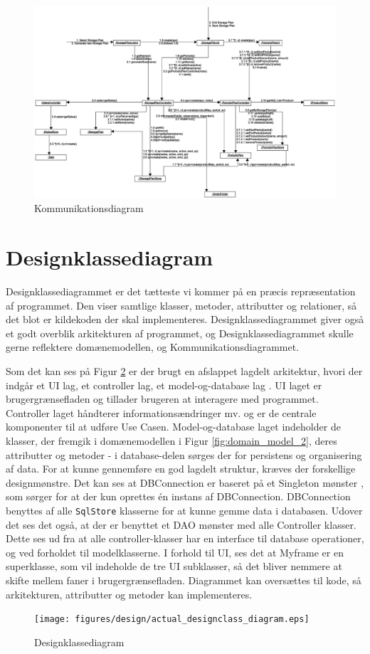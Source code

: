 \begin{landscape}
    \begin{figure}[p]
        \centering
        \includegraphics[width=0.8\hsize]{figures/design/Kommunikationsdiagram.eps}
        \caption{Kommunikationsdiagram}
        \label{fig:Kommunikationsdiagram}
    \end{figure}
\end{landscape}

\section{Designklassediagram}
Designklassediagrammet er det tætteste vi kommer på en præcis repræsentation af programmet. Den viser samtlige klasser, metoder, attributter og relationer, så det blot er kildekoden der skal implementeres. Designklassediagrammet giver også et godt overblik arkitekturen af programmet, og Designklassediagrammet skulle gerne reflektere domænemodellen, og Kommunikationsdiagrammet.

Som det kan ses på Figur \ref{fig:designclassdiagram} er der brugt en afslappet lagdelt arkitektur, hvori der indgår et UI lag, et controller lag, et model-og-database lag \cite{Larman2004}. UI laget er brugergrænsefladen og tillader brugeren at interagere med programmet. Controller laget håndterer informationsændringer mv. og er de centrale komponenter til at udføre Use Casen. Model-og-database laget indeholder de klasser, der fremgik i domænemodellen i Figur \ref{fig:domain_model_2}, deres attributter og metoder - i database-delen sørges der for persistens og organisering af data. 
For at kunne gennemføre en god lagdelt struktur, kræves der forskellige designmønstre. Det kan ses at DBConnection er baseret på et Singleton mønster \cite{Larman2004}, som sørger for at der kun oprettes én instans af DBConnection. DBConnection benyttes af alle \verb|SqlStore| klasserne for at kunne gemme data i databasen. Udover det ses det også, at der er benyttet et DAO mønster \cite{DAO} med alle Controller klasser. Dette ses ud fra at alle controller-klasser har en interface til database operationer, og ved forholdet til modelklasserne.
I forhold til UI, ses det at Myframe er en superklasse, som vil indeholde de tre UI subklasser, så det bliver nemmere at skifte mellem faner i brugergrænsefladen.
Diagrammet kan oversættes til kode, så arkitekturen, attributter og metoder kan implementeres.

\begin{landscape}
    \begin{figure}
        \centering
        \texttt{[image: figures/design/actual\_designclass\_diagram.eps]}
        \caption{Designklassediagram}
        \label{fig:designclassdiagram}
    \end{figure}
\end{landscape}

